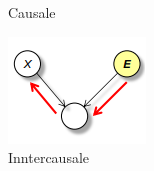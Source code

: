 \begin{figure}[!ht]
\begin{subfigure}[b]{0.14\textwidth}
        \caption{Causale}
        \label{fig:causale}
    \end{subfigure}
    \hfill
    \begin{subfigure}[b]{0.26\textwidth}
        \includegraphics[width=\textwidth]{./img/Reti/Intercausale.png}
        \caption{Inntercausale}
        \label{fig:intercausale}
    \end{subfigure}
    \hfill
    \begin{subfigure}[b]{0.14\textwidth}

\end{subfigure}
\end{figure}
